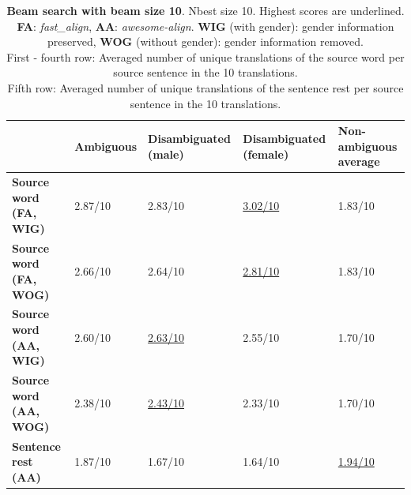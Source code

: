 \begin{table}[!htb]

    \begin{subtable}{\textwidth}
        \centering
        \begin{tabularx}{\linewidth}{|X|XXXX|}
            \hline
             & \textbf{Ambiguous} & \textbf{Disambiguated (male)} & \textbf{Disambiguated (female)} & \textbf{Non-ambiguous average} \\ \hline
             \textbf{Source word (FA, WIG)} & 2.87/10 & 2.83/10 & \underline{3.02/10} & 1.83/10 \\
             \textbf{Source word (FA, WOG)} & 2.66/10 & 2.64/10 & \underline{2.81/10} & 1.83/10 \\
             \textbf{Source word (AA, WIG)} & 2.60/10 & \underline{2.63/10} & 2.55/10 & 1.70/10 \\ 
             \textbf{Source word (AA, WOG)} & 2.38/10 & \underline{2.43/10} & 2.33/10 & 1.70/10 \\\hline 
             \textbf{Sentence rest (AA)} & 1.87/10 & 1.67/10 & 1.64/10 & \underline{1.94/10} \\ \hline
        \end{tabularx}
        \caption{\textbf{Beam search with beam size 10}. Nbest size 10. Highest scores are underlined. \textbf{FA}: \textit{fast\_align}, \textbf{AA}: \textit{awesome-align}. \textbf{WIG} (with gender): gender information preserved, \textbf{WOG} (without gender): gender information removed. \\ First - fourth row: Averaged number of unique translations of the source word per source sentence in the 10 translations. \\ Fifth row: Averaged number of unique translations of the sentence rest per source sentence in the 10 translations.}
        \label{tab:alignment_translation_10}
    \end{subtable}


\end{table}
